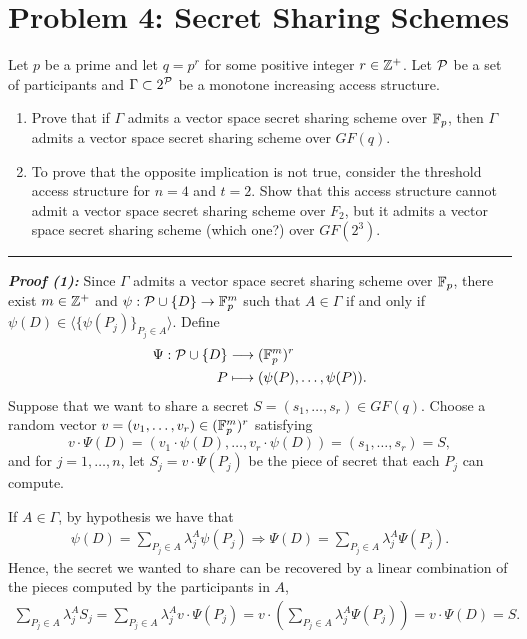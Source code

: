 \section{Problem 4: Secret Sharing Schemes}\label{sec:problem4}

Let $p$ be a prime and let $q = p^r$ for some positive integer $r\in \Z ^+$.
Let $\P$ be a set of participants and $\Gamma \subset 2^\P$ be a monotone increasing access structure.

\begin{enumerate}
    \item Prove that if $\Gamma$ admits a vector space secret sharing scheme over $\F_p$, then $\Gamma$ admits a vector space secret sharing scheme over $GF(q)$.
    \item To prove that the opposite implication is not true, consider the threshold access structure for $n=4$ and $t=2$. Show that this access structure cannot admit a vector space secret sharing scheme over $F_2$, but it admits a vector space secret sharing scheme (which one?) over $GF(2^3)$.
\end{enumerate}

\begin{center}
    \rule{5cm}{0.4pt}
\end{center}

\textbf{\textit{Proof (1):}}
Since $\Gamma$ admits a vector space secret sharing scheme over $\F_p$, there exist $m\in \Z^+$ and $\psi : \P\cup \{D\} \to \F_p^m$ such that $A\in \Gamma$ if and only if $\psi(D)\in\langle \{\psi(P_j)\}_{P_j\in A}\rangle$.
Define
\begin{equation*}
    \begin{split}
        \Psi: \P\cup\{D\} &\longrightarrow (\F_p^m)^r\\
        P &\longmapsto (\psi(P),\ldots, \psi(P)).
    \end{split}
\end{equation*}
Suppose that we want to share a secret $S = (s_1, \ldots, s_r) \in GF(q)$.
Choose a random vector $v = (v_1, \ldots, v_r)\in (\F_p^m)^r$ satisfying $$v \cdot \Psi(D) = (v_1 \cdot \psi(D), \ldots, v_r \cdot \psi(D)) = (s_1, \ldots, s_r) = S,$$ and for $j = 1,\ldots, n$, let $S_j = v\cdot\Psi(P_j)$ be the piece of secret that each $P_j$ can compute.

If $A\in \Gamma$, by hypothesis we have that 
\begin{equation*}
    \begin{split}
        \psi(D) = \sum_{P_j\in A} \lambda^A_j \psi(P_j) \Rightarrow \Psi(D) = \sum_{P_j\in A} \lambda^A_j \Psi(P_j).
    \end{split}
\end{equation*}
Hence, the secret we wanted to share can be recovered by a linear combination of the pieces computed by the participants in $A$, 
\begin{equation*}
    \begin{split}
        \sum_{P_j \in A} \lambda^A_j S_j = \sum_{P_j \in A} \lambda^A_j v\cdot \Psi(P_j) = v\cdot (\sum_{P_j \in A} \lambda^A_j \Psi(P_j)) = v\cdot \Psi(D) = S.
    \end{split}
\end{equation*}

